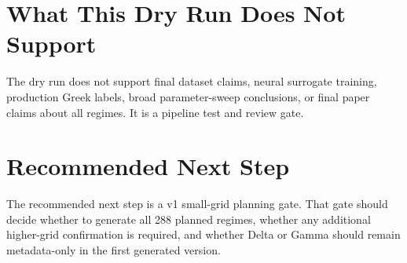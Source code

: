 \documentclass[11pt,a4paper]{article}
\begin{document}
\section{What This Dry Run Does Not Support}

The dry run does not support final dataset claims, neural surrogate training, production Greek
labels, broad parameter-sweep conclusions, or final paper claims about all regimes. It is a
pipeline test and review gate.

\section{Recommended Next Step}

The recommended next step is a v1 small-grid planning gate. That gate should decide whether to
generate all 288 planned regimes, whether any additional higher-grid confirmation is required,
and whether Delta or Gamma should remain metadata-only in the first generated version.



\end{document}
